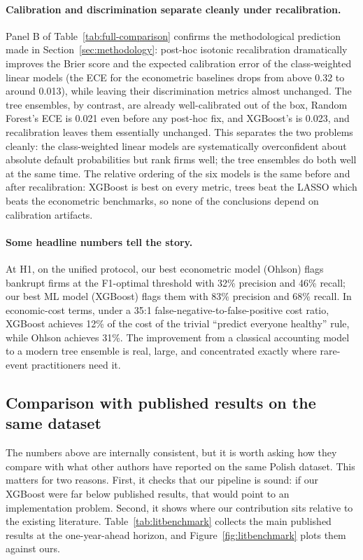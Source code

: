 \documentclass[12pt,a4paper]{article}
\begin{document}
\paragraph{Calibration and discrimination separate cleanly under
recalibration.} Panel B of Table~\ref{tab:full-comparison} confirms the
methodological prediction made in Section~\ref{sec:methodology}: post-hoc
isotonic recalibration dramatically improves the Brier score and the
expected calibration error of the class-weighted linear models (the ECE for
the econometric baselines drops from above 0.32 to around 0.013), while
leaving their discrimination metrics almost unchanged. The tree ensembles,
by contrast, are already well-calibrated out of the box, Random Forest's
ECE is 0.021 even before any post-hoc fix, and XGBoost's is 0.023, and
recalibration leaves them essentially unchanged. This separates the two
problems cleanly: the class-weighted linear models are systematically
overconfident about absolute default probabilities but rank firms well;
the tree ensembles do both well at the same time. The relative ordering of the six models is the same before and after
recalibration: XGBoost is best on every metric, trees beat the LASSO which
beats the econometric benchmarks, so none of the conclusions depend on
calibration artifacts.

\paragraph{Some headline numbers tell the story.} At H1, on the unified
protocol, our best econometric model (Ohlson) flags bankrupt firms at the
F1-optimal threshold with 32\% precision and 46\% recall; our best ML model
(XGBoost) flags them with 83\% precision and 68\% recall. In economic-cost
terms, under a 35:1 false-negative-to-false-positive cost ratio, XGBoost
achieves 12\% of the cost of the trivial ``predict everyone healthy'' rule,
while Ohlson achieves 31\%. The improvement from a classical accounting
model to a modern tree ensemble is real, large, and concentrated exactly
where rare-event practitioners need it.

\subsection{Comparison with published results on the same dataset}
\label{sec:litbenchmark}

The numbers above are internally consistent, but it is worth asking how they
compare with what other authors have reported on the same Polish dataset. This
matters for two reasons. First, it checks that our pipeline is sound: if our
XGBoost were far below published results, that would point to an implementation
problem. Second, it shows where our contribution sits relative to the existing
literature. Table~\ref{tab:litbenchmark} collects the main published results at
the one-year-ahead horizon, and Figure~\ref{fig:litbenchmark} plots them
against ours.
\end{document}
